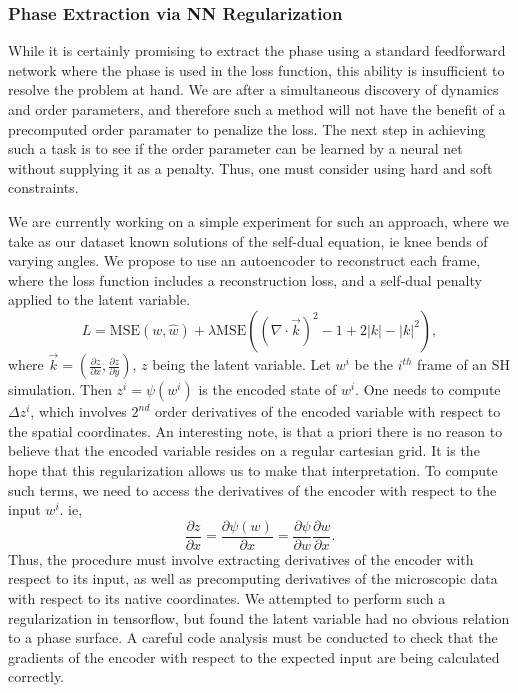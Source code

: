 \documentclass[12pt]{article}
\numberwithin{equation}{section}
\begin{document}
\subsubsection{Phase Extraction via NN Regularization}
\par While it is certainly promising to extract the phase using a standard feedforward network where the phase is used in the loss function, this ability is insufficient to resolve the problem at hand. We are after a simultaneous discovery of dynamics and order parameters, and therefore such a method will not have the benefit of a precomputed order paramater to penalize the loss. The next step in achieving such a task is to see if the order parameter can be learned by a neural net without supplying it as a penalty. Thus, one must consider using hard and soft constraints.
\par We are currently working on a simple experiment for such an approach, where we take as our dataset known solutions of the self-dual equation, ie knee bends of varying angles. We propose to use an autoencoder to reconstruct each frame, where the loss function includes a reconstruction loss, and a self-dual penalty applied to the latent variable. 
\begin{equation}
    L = \text{MSE}(w,\hat{w}) + \lambda \text{MSE}\left((\nabla \cdot \vec{k})^2-1+2|k| -|k|^2\right),
\end{equation}
where $\vec{k} = (\frac{\partial z}{\partial x},\frac{\partial z}{\partial y})$, $z$ being the latent variable. Let $w^{i}$ be the $i^{th}$ frame of an SH simulation. Then $z^{i} = \psi(w^{i})$ is the encoded state of $w^{i}$. One needs to compute $\Delta z^{i}$, which involves $2^{nd}$ order derivatives of the encoded variable with respect to the spatial coordinates. An interesting note, is that a priori there is no reason to believe that the encoded variable resides on a regular cartesian grid. It is the hope that this regularization allows us to make that interpretation. To compute such terms, we need to access the derivatives of the encoder with respect to the input $w^{i}$. ie,
\begin{equation*}
    \frac{\partial z}{\partial x} =  \frac{\partial \psi(w)}{\partial x} = \frac{\partial \psi}{\partial w}\frac{\partial w}{\partial x}.
\end{equation*}
Thus, the procedure must involve extracting derivatives of the encoder with respect to its input, as well as precomputing derivatives of the microscopic data with respect to its native coordinates. We attempted to perform such a regularization in tensorflow, but found the latent variable had no obvious relation to a phase surface. A careful code analysis must be conducted to check that the gradients of the encoder with respect to the expected input are being calculated correctly. 
\end{document}

